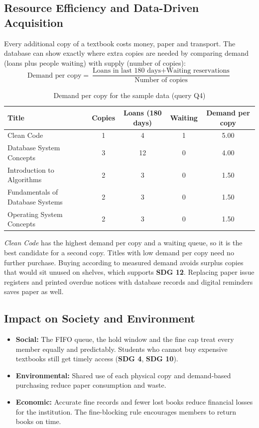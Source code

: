 \documentclass[11pt,a4paper]{report}
\begin{document}
\subsection{Resource Efficiency and Data-Driven Acquisition}
Every additional copy of a textbook costs money, paper and transport. The database can show exactly where extra copies are needed by comparing demand (loans plus people waiting) with supply (number of copies):
$$\text{Demand per copy} = \frac{\text{Loans in last 180 days} + \text{Waiting reservations}}{\text{Number of copies}}$$

\begin{table}[H]
    \centering
    \caption{Demand per copy for the sample data (query Q4)}
    \footnotesize
    \begin{tabular}{|l|c|c|c|c|}
        \hline
        \textbf{Title} & \textbf{Copies} & \textbf{Loans (180 days)} & \textbf{Waiting} & \textbf{Demand per copy} \\ \hline
        Clean Code & 1 & 4 & 1 & 5.00 \\ \hline
        Database System Concepts & 3 & 12 & 0 & 4.00 \\ \hline
        Introduction to Algorithms & 2 & 3 & 0 & 1.50 \\ \hline
        Fundamentals of Database Systems & 2 & 3 & 0 & 1.50 \\ \hline
        Operating System Concepts & 2 & 3 & 0 & 1.50 \\ \hline
    \end{tabular}
\end{table}

\textit{Clean Code} has the highest demand per copy and a waiting queue, so it is the best candidate for a second copy. Titles with low demand per copy need no further purchase. Buying according to measured demand avoids surplus copies that would sit unused on shelves, which supports \textbf{SDG 12}. Replacing paper issue registers and printed overdue notices with database records and digital reminders saves paper as well.

\subsection{Impact on Society and Environment}
\begin{itemize}
    \item \textbf{Social:} The FIFO queue, the hold window and the fine cap treat every member equally and predictably. Students who cannot buy expensive textbooks still get timely access (\textbf{SDG 4}, \textbf{SDG 10}).
    \item \textbf{Environmental:} Shared use of each physical copy and demand-based purchasing reduce paper consumption and waste.
    \item \textbf{Economic:} Accurate fine records and fewer lost books reduce financial losses for the institution. The fine-blocking rule encourages members to return books on time.
\end{itemize}
\end{document}
